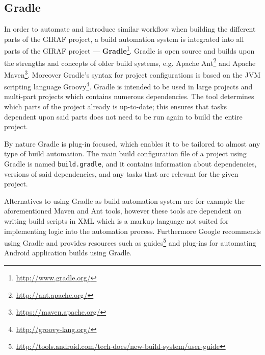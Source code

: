 \subsection*{Gradle}\label{subsec:gradle}
In order to automate and introduce similar workflow when building the different parts of the GIRAF project, a build automation system is integrated into all parts of the GIRAF project --- \textbf{Gradle}\footnote{\url{http://www.gradle.org/}}.
Gradle is open source and builds upon the strengths and concepts of older build systems, e.g. Apache Ant\footnote{\url{http://ant.apache.org/}} and Apache Maven\footnote{\url{https://maven.apache.org/}}.
Moreover Gradle's syntax for project configurations is based on the JVM scripting language Groovy\footnote{\url{http://groovy-lang.org/}}.
Gradle is intended to be used in large projects and multi-part projects which contains numerous dependencies.
The tool determines which parts of the project already is up-to-date; this ensures that tasks dependent upon said parts does not need to be run again to build the entire project. 

By nature Gradle is plug-in focused, which enables it to be tailored to almost any type of build automation.
The main build configuration file of a project using Gradle is named \texttt{build.gradle}, and it contains information about dependencies, versions of said dependencies, and any tasks that are relevant for the given project.
                                       
Alternatives to using Gradle as build automation system are for example the aforementioned Maven and Ant tools, however these tools are dependent on writing build scripts in XML which is a markup language not suited for implementing logic into the automation process.
Furthermore Google recommends using Gradle and provides resources such as guides\footnote{\url{http://tools.android.com/tech-docs/new-build-system/user-guide}} and plug-ins for automating Android application builds using Gradle.